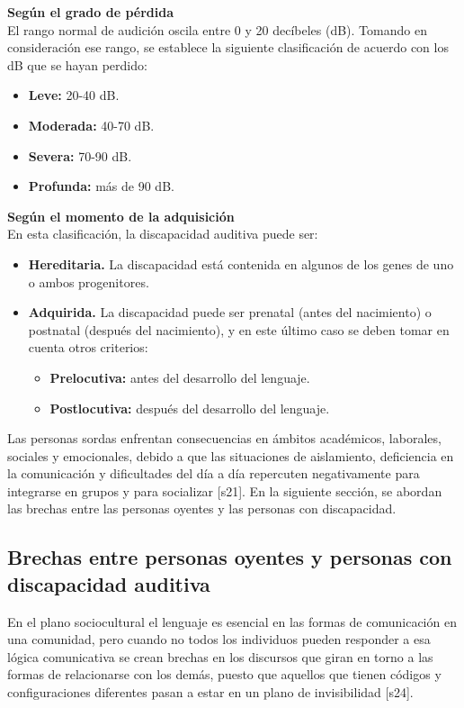 \textbf{Según el grado de pérdida}\\
El rango normal de audición oscila entre 0 y 20 decíbeles (dB). Tomando en consideración ese rango, se establece la siguiente clasificación de acuerdo con los dB que se hayan perdido:

\begin{itemize}
    \item \textbf{Leve:} 20-40 dB.  
    \item \textbf{Moderada:} 40-70 dB.  
    \item \textbf{Severa:} 70-90 dB.  
    \item \textbf{Profunda:} más de 90 dB.  
\end{itemize}

\textbf{Según el momento de la adquisición}\\
En esta clasificación, la discapacidad auditiva puede ser:

\begin{itemize}
    \item \textbf{Hereditaria.} La discapacidad está contenida en algunos de los genes de uno o ambos progenitores.  
    \item \textbf{Adquirida.} La discapacidad puede ser prenatal (antes del nacimiento) o postnatal (después del nacimiento), y en este último caso se deben tomar en cuenta otros criterios:
        \begin{itemize}
        \item \textbf{Prelocutiva:} antes del desarrollo del lenguaje.  
        \item \textbf{Postlocutiva:} después del desarrollo del lenguaje.  
        \end{itemize}
    \end{itemize}

Las personas sordas enfrentan consecuencias en ámbitos académicos, laborales, sociales y emocionales, debido a que las situaciones de aislamiento, deficiencia en la comunicación y dificultades del día a día repercuten negativamente para integrarse en grupos y para socializar [s21]. En la siguiente sección, se abordan las brechas entre las personas oyentes y las personas con discapacidad.

\subsection{Brechas entre personas oyentes y personas con discapacidad auditiva}
En el plano sociocultural el lenguaje es esencial en las formas de comunicación en una comunidad, pero cuando no todos los individuos pueden responder a esa lógica comunicativa se crean brechas en los discursos que giran en torno a las formas de relacionarse con los demás, puesto que aquellos que tienen códigos y configuraciones diferentes pasan a estar en un plano de invisibilidad [s24].\\

